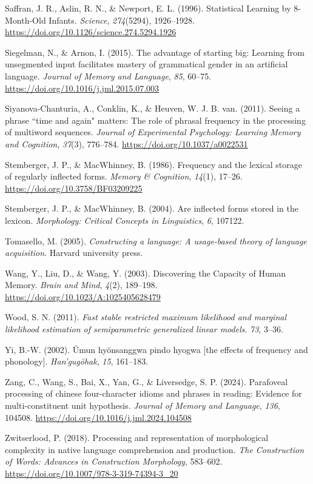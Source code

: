 \documentclass[
  man,floatsintext]{apa6}
\newlength{\cslhangindent}
\newenvironment{CSLReferences}[2] %
 {\begin{list}{}{%
  \setlength{\itemindent}{0pt}
  \setlength{\leftmargin}{0pt}
  \setlength{\parsep}{0pt}
  \ifodd #1
   \setlength{\leftmargin}{\cslhangindent}
   \setlength{\itemindent}{-1\cslhangindent}
  \fi
  \setlength{\itemsep}{#2\baselineskip}}}
 {\end{list}}
\begin{document}
\begin{CSLReferences}{1}{0}
Saffran, J. R., Aslin, R. N., \& Newport, E. L. (1996). Statistical Learning by 8-Month-Old Infants. \emph{Science}, \emph{274}(5294), 1926--1928. \url{https://doi.org/10.1126/science.274.5294.1926}

Siegelman, N., \& Arnon, I. (2015). The advantage of starting big: Learning from unsegmented input facilitates mastery of grammatical gender in an artificial language. \emph{Journal of Memory and Language}, \emph{85}, 60--75. \url{https://doi.org/10.1016/j.jml.2015.07.003}

Siyanova-Chanturia, A., Conklin, K., \& Heuven, W. J. B. van. (2011). Seeing a phrase {``}time and again{"} matters: The role of phrasal frequency in the processing of multiword sequences. \emph{Journal of Experimental Psychology: Learning Memory and Cognition}, \emph{37}(3), 776--784. \url{https://doi.org/10.1037/a0022531}

Stemberger, J. P., \& MacWhinney, B. (1986). Frequency and the lexical storage of regularly inflected forms. \emph{Memory \& Cognition}, \emph{14}(1), 17--26. \url{https://doi.org/10.3758/BF03209225}

Stemberger, J. P., \& MacWhinney, B. (2004). Are inflected forms stored in the lexicon. \emph{Morphology: Critical Concepts in Linguistics}, \emph{6}, 107122.

Tomasello, M. (2005). \emph{Constructing a language: A usage-based theory of language acquisition}. Harvard university press.

Wang, Y., Liu, D., \& Wang, Y. (2003). Discovering the Capacity of Human Memory. \emph{Brain and Mind}, \emph{4}(2), 189--198. \url{https://doi.org/10.1023/A:1025405628479}

Wood, S. N. (2011). \emph{Fast stable restricted maximum likelihood and marginal likelihood estimation of semiparametric generalized linear models}. \emph{73}, 3--36.

Yi, B.-W. (2002). Ŭmun hyŏnsanggwa pindo hyogwa {[}the effects of frequency and phonology{]}. \emph{Han'gugŏhak}, \emph{15}, 161--183.

Zang, C., Wang, S., Bai, X., Yan, G., \& Liversedge, S. P. (2024). Parafoveal processing of chinese four-character idioms and phrases in reading: Evidence for multi-constituent unit hypothesis. \emph{Journal of Memory and Language}, \emph{136}, 104508. \url{https://doi.org/10.1016/j.jml.2024.104508}

Zwitserlood, P. (2018). Processing and representation of morphological complexity in native language comprehension and production. \emph{The Construction of Words: Advances in Construction Morphology}, 583--602. \url{https://doi.org/10.1007/978-3-319-74394-3_20}

\end{CSLReferences}
\end{document}
